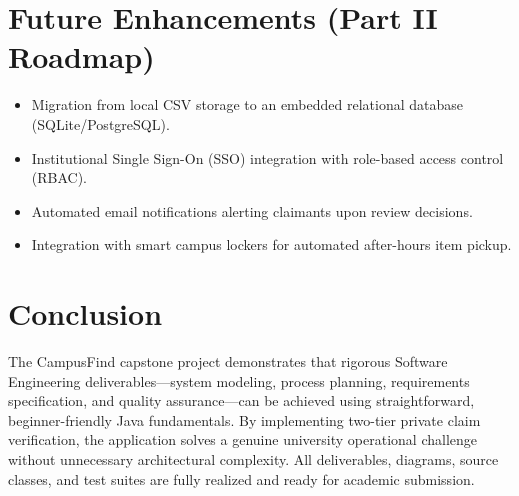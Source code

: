 \documentclass[11pt,a4paper]{article}
\begin{document}
\section{Future Enhancements (Part II Roadmap)}
\begin{itemize}
    \item Migration from local CSV storage to an embedded relational database (SQLite/PostgreSQL).
    \item Institutional Single Sign-On (SSO) integration with role-based access control (RBAC).
    \item Automated email notifications alerting claimants upon review decisions.
    \item Integration with smart campus lockers for automated after-hours item pickup.
\end{itemize}

\section{Conclusion}
The CampusFind capstone project demonstrates that rigorous Software Engineering deliverables—system modeling, process planning, requirements specification, and quality assurance—can be achieved using straightforward, beginner-friendly Java fundamentals. By implementing two-tier private claim verification, the application solves a genuine university operational challenge without unnecessary architectural complexity. All deliverables, diagrams, source classes, and test suites are fully realized and ready for academic submission.

\end{document}

